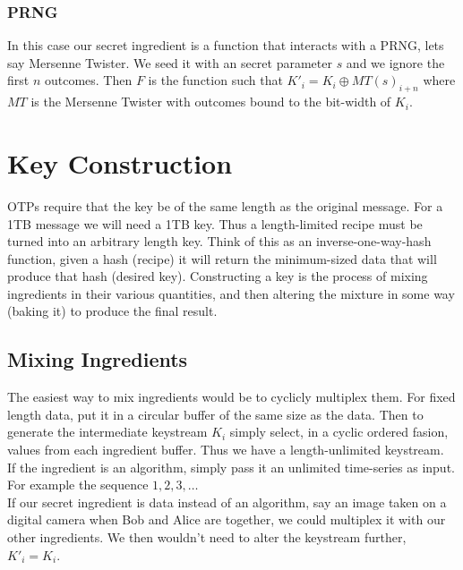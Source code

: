 \documentclass[10pt,conference,a4article]{IEEEtran}
\begin{document}
\subsubsection{PRNG}
In this case our secret ingredient is a function that interacts with a PRNG, lets
say Mersenne Twister. We seed it with an secret parameter $s$ and we ignore the 
first $n$ outcomes. Then $F$ is the function such that $K'_i =
K_i\oplus MT(s)_{i+n}$ where $MT$ is the Mersenne Twister with outcomes bound to
the bit-width of $K_i$.

\section{Key Construction}
OTPs require that the key be of the same length as the original message. For a 1TB
message we will need a 1TB key. Thus a length-limited recipe must be turned into an
arbitrary length key. Think of this as an inverse-one-way-hash function, given a
hash (recipe) it will return the minimum-sized data that will produce that hash
(desired key). Constructing a key is the process of mixing ingredients in their 
various quantities, and then altering the mixture in some way (baking it) to
produce the final result.

\subsection{Mixing Ingredients}
The easiest way to mix ingredients would be to cyclicly multiplex them. For fixed
length data, put it in a circular buffer of the same size as the data. Then to
generate the intermediate keystream $K_i$ simply select, in a cyclic ordered
fasion, values from each ingredient buffer. Thus we have a length-unlimited keystream.
\\[2ex]
If the ingredient is an algorithm, simply pass it an unlimited time-series as
input. For example the sequence $1,2,3,\dots$
\\[2ex]
If our secret ingredient is data instead of an algorithm, say an image taken on
a digital camera when Bob and Alice are together, we could multiplex it with our
other ingredients. We then wouldn't need to alter the keystream further, $K'_i = K_i$.
\end{document}
